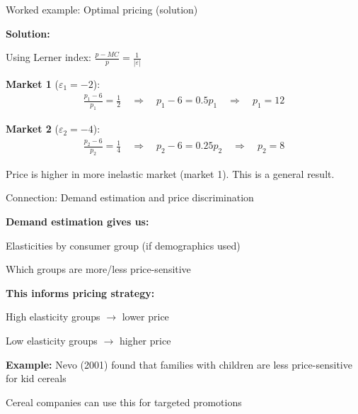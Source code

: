\documentclass[notes,11pt, aspectratio=169]{beamer}
\newenvironment{wideitemize}{\itemize\addtolength{\itemsep}{10pt}}{\enditemize}
\begin{document}
\begin{frame}{Worked example: Optimal pricing (solution)}
	\begin{wideitemize}
		\item \textbf{Solution:}
		\item Using Lerner index: $\frac{p - MC}{p} = \frac{1}{|\varepsilon|}$
		\item \textbf{Market 1} ($\varepsilon_1 = -2$):
		\begin{align*}
			\frac{p_1 - 6}{p_1} = \frac{1}{2} \quad \Rightarrow \quad p_1 - 6 = 0.5 p_1 \quad \Rightarrow \quad p_1 = 12
		\end{align*}
		\item \textbf{Market 2} ($\varepsilon_2 = -4$):
		\begin{align*}
			\frac{p_2 - 6}{p_2} = \frac{1}{4} \quad \Rightarrow \quad p_2 - 6 = 0.25 p_2 \quad \Rightarrow \quad p_2 = 8
		\end{align*}
		\item Price is higher in more inelastic market (market 1). This is a general result.
	\end{wideitemize}
\end{frame}

\begin{frame}{Connection: Demand estimation and price discrimination}
	\begin{wideitemize}
		\item \textbf{Demand estimation gives us:}
		\begin{wideitemize}
			\vspace{5pt}
			\item Elasticities by consumer group (if demographics used)
			\item Which groups are more/less price-sensitive
		\end{wideitemize}
		\item \textbf{This informs pricing strategy:}
		\begin{wideitemize}
			\vspace{5pt}
			\item High elasticity groups $\rightarrow$ lower price
			\item Low elasticity groups $\rightarrow$ higher price
		\end{wideitemize}
		\item \textbf{Example:} Nevo (2001) found that families with children are less price-sensitive for kid cereals
		\item Cereal companies can use this for targeted promotions
	\end{wideitemize}
\end{frame}
\end{document}
